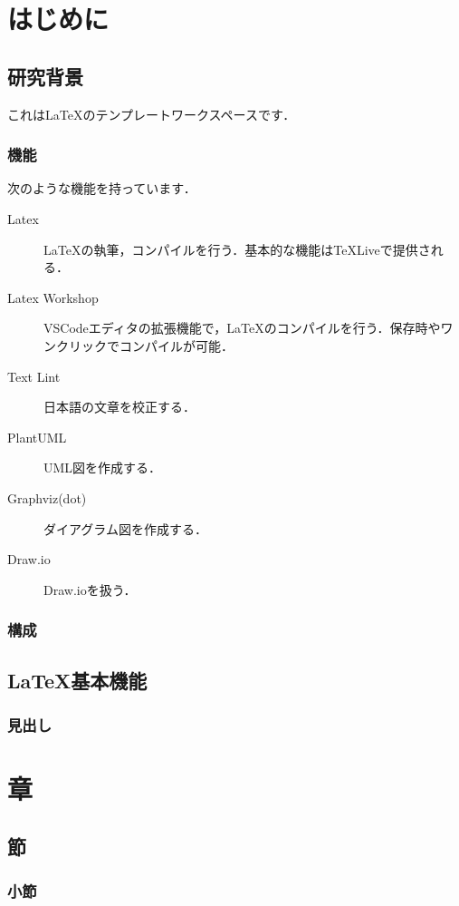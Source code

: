 \documentclass[main]{subfiles}
\begin{document}
\chapter{はじめに}
\section{研究背景}
これは\LaTeX のテンプレートワークスペースです．
\subsection{機能}
次のような機能を持っています．
\begin{description}
  \item[Latex] \LaTeX の執筆，コンパイルを行う．基本的な機能は\TeX Liveで提供される．
  \item[Latex Workshop] VSCodeエディタの拡張機能で，\LaTeX のコンパイルを行う．保存時やワンクリックでコンパイルが可能．
  \item[Text Lint] 日本語の文章を校正する．
  \item[PlantUML] UML図を作成する．
  \item[Graphviz(dot)] ダイアグラム図を作成する．
  \item[Draw.io] Draw.ioを扱う．
\end{description}

\subsection{構成}

\section{\LaTeX 基本機能}

\subsection{見出し}

{\let\clearpage\relax \chapter*{章}}

\section*{節}

\subsection*{小節}
\end{document}
